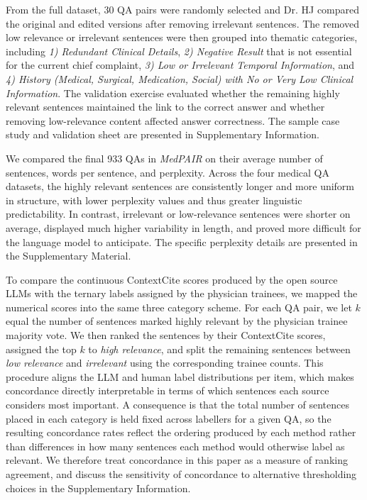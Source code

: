 \documentclass[fleqn,10pt]{wlscirep}
\begin{document}
From the full dataset, 30 QA pairs were randomly selected and Dr. HJ compared the original and edited versions after removing irrelevant sentences. The removed low relevance or irrelevant sentences were then grouped into thematic categories, including \textit{1) Redundant Clinical Details}, \textit{2) Negative Result} that is not essential for the current chief complaint, \textit{3) Low or Irrelevant Temporal Information}, and \textit{4) History (Medical, Surgical, Medication, Social) with No or Very Low Clinical Information}. The validation exercise evaluated whether the remaining highly relevant sentences maintained the link to the correct answer and whether removing low-relevance content affected answer correctness. The sample case study and validation sheet are presented in Supplementary Information.

We compared the final 933 QAs in \emph{MedPAIR} on their average number of sentences, words per sentence, and perplexity. Across the four medical QA datasets, the highly relevant sentences are consistently longer and more uniform in structure, with lower perplexity values and thus greater linguistic predictability. In contrast, irrelevant or low‐relevance sentences were shorter on average, displayed much higher variability in length, and proved more difficult for the language model to anticipate. The specific perplexity details are presented in the Supplementary Material. %

To compare the continuous ContextCite scores produced by the open source LLMs with the ternary labels assigned by the physician trainees, we mapped the numerical scores into the same three category scheme. For each QA pair, we let $k$ equal the number of sentences marked highly relevant by the physician trainee majority vote. We then ranked the sentences by their ContextCite scores, assigned the top $k$ to \textit{high relevance}, and split the remaining sentences between \textit{low relevance} and \textit{irrelevant} using the corresponding trainee counts. This procedure aligns the LLM and human label distributions per item, which makes concordance directly interpretable in terms of which sentences each source considers most important. A consequence is that the total number of sentences placed in each category is held fixed across labellers for a given QA, so the resulting concordance rates reflect the ordering produced by each method rather than differences in how many sentences each method would otherwise label as relevant. We therefore treat concordance in this paper as a measure of ranking agreement, and discuss the sensitivity of concordance to alternative thresholding choices in the Supplementary Information.
\end{document}
